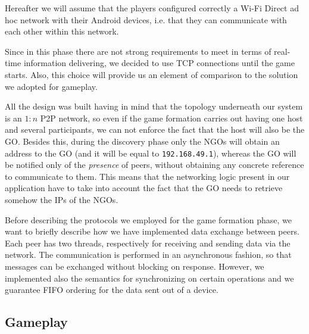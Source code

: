 Hereafter we will assume that the players configured correctly a Wi-Fi Direct
ad hoc network with their Android devices, i.e. that they can communicate with
each other within this network.

Since in this phase there are not strong requirements to meet in terms of
real-time information delivering, we decided to use TCP connections until the
game starts. Also, this choice will provide us an element of comparison to the
solution we adopted for gameplay.

All the design was built having in mind that the topology underneath our system
is an $1:n$ P2P network, so even if the game formation carries out having one
host and several participants, we can not enforce the fact that the host will
also be the GO. Besides this, during the discovery phase only the NGOs will
obtain an address to the GO (and it will be equal to \texttt{192.168.49.1}),
whereas the GO will be notified only of the \textit{presence} of peers, without
obtaining any concrete reference to communicate to them. This means that the
networking logic present in our application have to take into account the fact
that the GO needs to retrieve somehow the IPs of the NGOs.

Before describing the protocols we employed for the game formation phase, we
want to briefly describe how we have implemented data exchange between peers.
Each peer has two threads, respectively for receiving and sending data via the
network. The communication is performed in an asynchronous fashion, so that
messages can be exchanged without blocking on response. However, we implemented
also the semantics for synchronizing on certain operations and we guarantee FIFO
ordering for the data sent out of a device.


\subsection{Gameplay}

